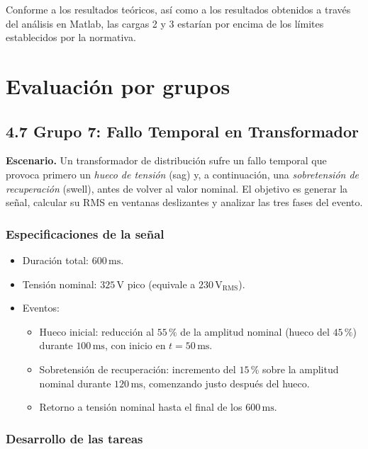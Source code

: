 \documentclass{article}
\begin{document}
Conforme a los resultados teóricos, así como a los resultados obtenidos a través del análisis en Matlab, las cargas 2 y 3 estarían por encima de los límites establecidos por la normativa. 



\newpage
\section{Evaluación por grupos}
\subsection*{4.7 \quad Grupo 7: Fallo Temporal en Transformador}

\textbf{Escenario.} Un transformador de distribución sufre un fallo temporal que provoca primero un \emph{hueco de tensión} (sag) y, a continuación, una \emph{sobretensión de recuperación} (swell), antes de volver al valor nominal. El objetivo es generar la señal, calcular su RMS en ventanas deslizantes y analizar las tres fases del evento.

\subsubsection*{Especificaciones de la señal}
\begin{itemize}
    \item Duración total: $600 \,\text{ms}$.
    \item Tensión nominal: $325 \,\text{V}$ pico (equivale a $230 \,\text{V}_{\text{RMS}}$).
    \item Eventos:
    \begin{itemize}
        \item Hueco inicial: reducción al $55\,\%$ de la amplitud nominal (hueco del $45\,\%$) durante $100 \,\text{ms}$, con inicio en $t = 50 \,\text{ms}$.
        \item Sobretensión de recuperación: incremento del $15\,\%$ sobre la amplitud nominal durante $120 \,\text{ms}$, comenzando justo después del hueco.
        \item Retorno a tensión nominal hasta el final de los $600 \,\text{ms}$.
    \end{itemize}
\end{itemize}

\subsubsection*{Desarrollo de las tareas}
\end{document}
